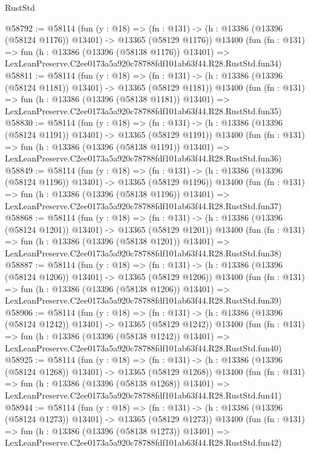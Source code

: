 \begin{lexlean}{RustStd}
\begin{coremodule}
@58792 := @58114
    (fun (y : @18) =>
    (fn : @131) -> (h : @13386 (@13396 (@58124 @1176)) @13401) -> @13365 (@58129 @1176))
    @13400
    (fun (fn : @131) =>
    fun (h : @13386 (@13396 (@58138 @1176)) @13401) =>
    LexLeanPreserve.C2ee0173a5a920c78788fdf101ab63f44.R28.RustStd.fun34)
@58811 := @58114
    (fun (y : @18) =>
    (fn : @131) -> (h : @13386 (@13396 (@58124 @1181)) @13401) -> @13365 (@58129 @1181))
    @13400
    (fun (fn : @131) =>
    fun (h : @13386 (@13396 (@58138 @1181)) @13401) =>
    LexLeanPreserve.C2ee0173a5a920c78788fdf101ab63f44.R28.RustStd.fun35)
@58830 := @58114
    (fun (y : @18) =>
    (fn : @131) -> (h : @13386 (@13396 (@58124 @1191)) @13401) -> @13365 (@58129 @1191))
    @13400
    (fun (fn : @131) =>
    fun (h : @13386 (@13396 (@58138 @1191)) @13401) =>
    LexLeanPreserve.C2ee0173a5a920c78788fdf101ab63f44.R28.RustStd.fun36)
@58849 := @58114
    (fun (y : @18) =>
    (fn : @131) -> (h : @13386 (@13396 (@58124 @1196)) @13401) -> @13365 (@58129 @1196))
    @13400
    (fun (fn : @131) =>
    fun (h : @13386 (@13396 (@58138 @1196)) @13401) =>
    LexLeanPreserve.C2ee0173a5a920c78788fdf101ab63f44.R28.RustStd.fun37)
@58868 := @58114
    (fun (y : @18) =>
    (fn : @131) -> (h : @13386 (@13396 (@58124 @1201)) @13401) -> @13365 (@58129 @1201))
    @13400
    (fun (fn : @131) =>
    fun (h : @13386 (@13396 (@58138 @1201)) @13401) =>
    LexLeanPreserve.C2ee0173a5a920c78788fdf101ab63f44.R28.RustStd.fun38)
@58887 := @58114
    (fun (y : @18) =>
    (fn : @131) -> (h : @13386 (@13396 (@58124 @1206)) @13401) -> @13365 (@58129 @1206))
    @13400
    (fun (fn : @131) =>
    fun (h : @13386 (@13396 (@58138 @1206)) @13401) =>
    LexLeanPreserve.C2ee0173a5a920c78788fdf101ab63f44.R28.RustStd.fun39)
@58906 := @58114
    (fun (y : @18) =>
    (fn : @131) -> (h : @13386 (@13396 (@58124 @1242)) @13401) -> @13365 (@58129 @1242))
    @13400
    (fun (fn : @131) =>
    fun (h : @13386 (@13396 (@58138 @1242)) @13401) =>
    LexLeanPreserve.C2ee0173a5a920c78788fdf101ab63f44.R28.RustStd.fun40)
@58925 := @58114
    (fun (y : @18) =>
    (fn : @131) -> (h : @13386 (@13396 (@58124 @1268)) @13401) -> @13365 (@58129 @1268))
    @13400
    (fun (fn : @131) =>
    fun (h : @13386 (@13396 (@58138 @1268)) @13401) =>
    LexLeanPreserve.C2ee0173a5a920c78788fdf101ab63f44.R28.RustStd.fun41)
@58944 := @58114
    (fun (y : @18) =>
    (fn : @131) -> (h : @13386 (@13396 (@58124 @1273)) @13401) -> @13365 (@58129 @1273))
    @13400
    (fun (fn : @131) =>
    fun (h : @13386 (@13396 (@58138 @1273)) @13401) =>
    LexLeanPreserve.C2ee0173a5a920c78788fdf101ab63f44.R28.RustStd.fun42)

\end{coremodule}
\end{lexlean}
